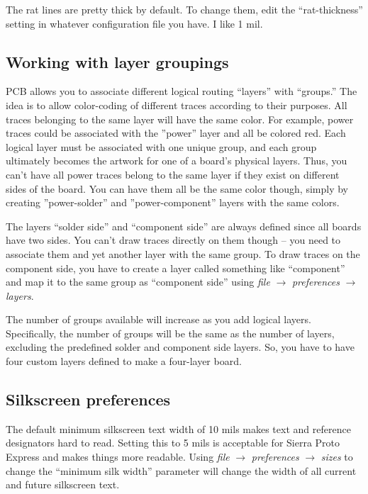 The rat lines are pretty thick by default.  To change them, edit the
``rat-thickness'' setting in whatever configuration file you have.  I
like 1 mil.




\subsection{Working with layer groupings}
PCB allows you to associate different logical routing ``layers'' with
``groups.''  The idea is to allow color-coding of different traces
according to their purposes.  All traces belonging to the same layer
will have the same color.  For example, power traces could be
associated with the ''power'' layer and all be colored red.  Each
logical layer must be associated with one unique group, and each group
ultimately becomes the artwork for one of a board's physical layers.
Thus, you can't have all power traces belong to the same layer if they
exist on different sides of the board.  You can have them all be the
same color though, simply by creating ''power-solder'' and
''power-component'' layers with the same colors.

The layers ``solder side'' and ``component side'' are always defined
since all boards have two sides.  You can't draw traces directly on
them though -- you need to associate them and yet another layer with
the same group.  To draw traces on the component side, you have to
create a layer called something like ``component'' and map it to the
same group as ``component side'' using \textsl{file} $\rightarrow$
\textsl{preferences} $\rightarrow$ \textsl{layers}.

The number of groups available will increase as you add logical
layers.  Specifically, the number of groups will be the same as the
number of layers, excluding the predefined solder and component side
layers.  So, you have to have four custom layers defined to make a
four-layer board.


\subsection{Silkscreen preferences}
The default minimum silkscreen text width of 10 mils makes text and
reference designators hard to read.  Setting this to 5 mils is
acceptable for Sierra Proto Express and makes things more readable.
Using \textsl{file} $\rightarrow$ \textsl{preferences} $\rightarrow$
\textsl{sizes} to change the ``minimum silk width'' parameter will
change the width of all current and future silkscreen text.


